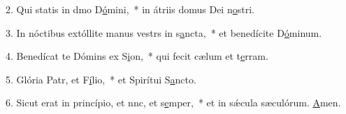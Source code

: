 2. Qui statis in dmo D\uline{ó}mini,~* in átriis domus Dei n\uline{o}stri.\par 
3. In nóctibus extóllite manus vestrs in s\uline{a}ncta,~* et benedícite D\uline{ó}minum.\par 
4. Benedícat te Dómins ex S\uline{i}on,~* qui fecit cælum et t\uline{e}rram.\par 
5. Glória Patr, et F\uline{í}lio,~* et Spirítui S\uline{a}ncto.\par 
6. Sicut erat in princípio, et nnc, et s\uline{e}mper,~* et in sǽcula sæculórum. \uline{A}men.\par 
